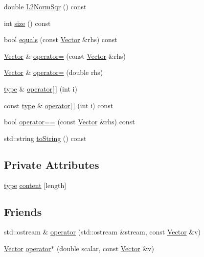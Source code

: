 \begin{DoxyCompactItemize}
\item 
double \hyperlink{classutils_1_1Vector_a25528c8e0124efc579ab798edcb59935}{L2\+Norm\+Sqr} () const 
\item 
int \hyperlink{classutils_1_1Vector_a4ed4172f5831a876dd9bd14f63dafd79}{size} () const 
\item 
bool \hyperlink{classutils_1_1Vector_a761ff3d4c09a533535452b2a20038782}{equals} (const \hyperlink{classutils_1_1Vector}{Vector} \&rhs) const 
\item 
\hyperlink{classutils_1_1Vector}{Vector} \& \hyperlink{classutils_1_1Vector_a16812f2bf90d9e79b58fd42860c111e7}{operator=} (const \hyperlink{classutils_1_1Vector}{Vector} \&rhs)
\item 
\hyperlink{classutils_1_1Vector}{Vector} \& \hyperlink{classutils_1_1Vector_a5c1cfa1d42abdd9a90b4913892608386}{operator=} (double rhs)
\item 
\hyperlink{classtype}{type} \& \hyperlink{classutils_1_1Vector_a391fe7cbc2441879439fbc191ec4ef03}{operator\mbox{[}$\,$\mbox{]}} (int i)
\item 
const \hyperlink{classtype}{type} \& \hyperlink{classutils_1_1Vector_a3b965c400abae02fcad3751cf4b79309}{operator\mbox{[}$\,$\mbox{]}} (int i) const 
\item 
bool \hyperlink{classutils_1_1Vector_a04ceba4a8df8a367205d1c57063ec3f8}{operator==} (const \hyperlink{classutils_1_1Vector}{Vector} \&rhs) const 
\item 
std\+::string \hyperlink{classutils_1_1Vector_ab71fcfc3a0e80ee4a7d2c0fc76fed9a0}{to\+String} () const 
\end{DoxyCompactItemize}
\subsection*{Private Attributes}
\begin{DoxyCompactItemize}
\item 
\hyperlink{classtype}{type} \hyperlink{classutils_1_1Vector_ab391d67eb8f8563b4dd4b80390a4631a}{content} \mbox{[}length\mbox{]}
\end{DoxyCompactItemize}
\subsection*{Friends}
\begin{DoxyCompactItemize}
\item 
std\+::ostream \& \hyperlink{classutils_1_1Vector_a49b910c983e6c91855b55ab04d401e4f}{operator} (std\+::ostream \&stream, const \hyperlink{classutils_1_1Vector}{Vector} \&v)
\item 
\hyperlink{classutils_1_1Vector}{Vector} \hyperlink{classutils_1_1Vector_a45c43d96a8bbe774870183ff33079584}{operator$\ast$} (double scalar, const \hyperlink{classutils_1_1Vector}{Vector} \&v)
\end{DoxyCompactItemize}


